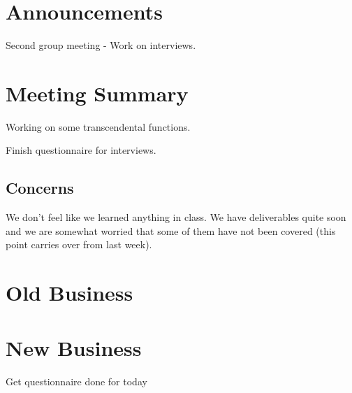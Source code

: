 \documentclass[11pt]{meetingmins}
\begin{document}
\maketitle

\section{Announcements}
\begin{hiddenitems}
\item
Second group meeting - Work on interviews.

\end{hiddenitems}

\section{Meeting Summary}
\begin{items}

\item
Working on some transcendental functions.

\item
Finish questionnaire for interviews.

\end{items}


\subsection{Concerns}
We don't feel like we learned anything in class. We have deliverables quite soon and we are somewhat worried that some of them have not been covered (this point carries over from last week).

\section{Old Business}
\begin{items}

\item

\end{items}

\section{New Business}
\begin{items}
\item
Get questionnaire done for today

\item


\end{items}

\vspace{1em}
\end{document}
